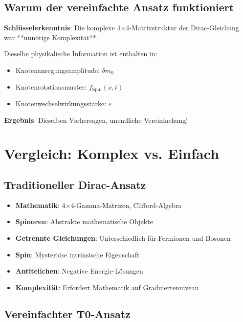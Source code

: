 \documentclass[12pt,a4paper]{article}
\newcommand{\deltam}{\delta m}
\theoremstyle{definition}
\theoremstyle{remark}
\begin{document}
	\subsection{Warum der vereinfachte Ansatz funktioniert}
	
	\begin{tcolorbox}[colback=green!5!white,colframe=green!75!black,title=Warum Vereinfachung gelingt]
		\textbf{Schlüsselerkenntnis}: Die komplexe 4×4-Matrixstruktur der Dirac-Gleichung war **unnötige Komplexität**.
		
		Dieselbe physikalische Information ist enthalten in:
		\begin{itemize}
			\item Knotenanregungsamplitude: $\deltam_0$
			\item Knotenrotationsmuster: $f_{\text{Spin}}(x,t)$
			\item Knotenwechselwirkungsstärke: $\varepsilon$
		\end{itemize}
		
		\textbf{Ergebnis}: Dieselben Vorhersagen, unendliche Vereinfachung!
	\end{tcolorbox}
	
	\section{Vergleich: Komplex vs. Einfach}
	
	\subsection{Traditioneller Dirac-Ansatz}
	
	\begin{itemize}
		\item \textbf{Mathematik}: 4×4-Gamma-Matrizen, Clifford-Algebra
		\item \textbf{Spinoren}: Abstrakte mathematische Objekte
		\item \textbf{Getrennte Gleichungen}: Unterschiedlich für Fermionen und Bosonen  
		\item \textbf{Spin}: Mysteriöse intrinsische Eigenschaft
		\item \textbf{Antiteilchen}: Negative Energie-Lösungen
		\item \textbf{Komplexität}: Erfordert Mathematik auf Graduiertenniveau
	\end{itemize}
	
	\subsection{Vereinfachter T0-Ansatz}
	
\end{document}

